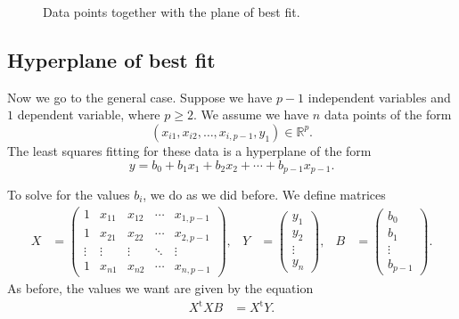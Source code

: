 \documentclass[a4paper, 12pt]{article}
\numberwithin{equation}{section}
\numberwithin{figure}{section}
\theoremstyle{definition}
\renewcommand{\geq}{\geqslant}
\newcommand{\R}{\mathbb{R}}
\newcommand{\tr}{\mathrm{t}}
\begin{document}
\begin{figure}[h]
	\centering
	\caption{Data points together with the plane of best fit.}
	\label{fig:plane-and-scatter}
\end{figure}

\subsection{Hyperplane of best fit}

Now we go to the general case. Suppose we have $p-1$ independent variables and
$1$ dependent variable, where $p\geq 2$. We assume we have $n$ data points of the form 
\[ 
	\left( x_{i1}, x_{i2}, \dots, x_{i,p-1}, y_1 \right) \in \R^p. 
\] 
The least squares fitting for these data is a hyperplane of the form 
\[ 
	y = b_0 + b_1 x_1 + b_2x_2 + \cdots + b_{p-1}x_{p-1}. 
\] 

To solve for the values $b_i$, we do as we did before. We define matrices 
\begin{align*}
	X &= \begin{pmatrix}
		1 & x_{11} & x_{12} & \cdots & x_{1,p-1} \\
		1 & x_{21} & x_{22} & \cdots & x_{2,p-1} \\
		\vdots & \vdots & \vdots & \ddots & \vdots \\
		1 & x_{n1} & x_{n2} & \cdots & x_{n,p-1} 
	\end{pmatrix}, & 
	Y &= \begin{pmatrix}
		y_1 \\ y_2 \\ \vdots \\ y_n 
	\end{pmatrix}, & 
	B &= \begin{pmatrix}
		b_0 \\ b_1 \\ \vdots \\ b_{p-1}
	\end{pmatrix}. 
\end{align*}
As before, the values we want are given by the equation 
\begin{align}\label{eqn:general-OLS}
	X^{\tr} X B &= X^{\tr} Y.
\end{align}
\end{document}
